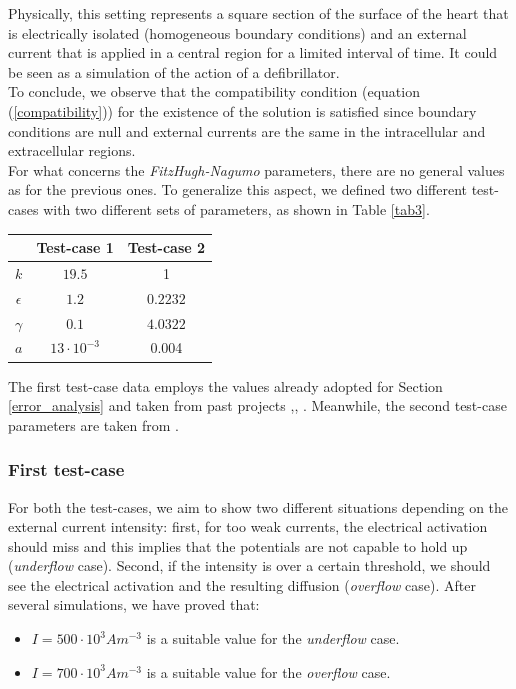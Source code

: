\documentclass[a4paper,11pt]{article}
\begin{document}
\noindent Physically, this setting represents a square section of the surface of the heart that is electrically isolated (homogeneous boundary conditions) and an external current that is applied in a central region for a limited interval of time. It could be seen as a simulation of the action of a defibrillator. \\
To conclude, we observe that the compatibility condition (equation (\ref{compatibility})) for the existence of the solution is satisfied since boundary conditions are null and external currents are the same in the intracellular and extracellular regions. \\

\noindent For what concerns the \emph{FitzHugh-Nagumo} parameters, there are no general values as for the previous ones. To generalize this aspect, we defined two different test-cases with two different sets of parameters, as shown in Table \ref{tab3}.

\begin{center}
	\label{tab3}
	\begin{tabular}{|c|c|c|} 
		\hline 
		 & Test-case 1 & Test-case 2 \\
		\hline \hline
		$k$ & $19.5 $ & 1 \\
		\hline
		$\epsilon$ & $1.2$ & $0.2232$ \\ 
		\hline
		$\gamma$ & $0.1$ & $4.0322$ \\
		\hline
		$a$ & $13\cdot 10^{-3}$ & 0.004 \\
		\hline
	\end{tabular}
\end{center}

\vspace{4mm}
\noindent The first test-case data employs the values already adopted for Section \ref{error_analysis} and taken from past projects \cite{bagnara},\cite{andreotti}, \cite{marta}. Meanwhile, the second test-case parameters are taken from \cite{mauricio}.

\subsubsection{First test-case}
For both the test-cases, we aim to show two different situations depending on the external current intensity: first, for too weak currents, the electrical activation should miss and this implies that the potentials are not capable to hold up (\emph{underflow} case). Second, if the intensity is over a certain threshold, we should see the electrical activation and the resulting diffusion (\emph{overflow} case). After several simulations, we have proved that:
\begin{itemize}
	\item $I = 500 \cdot 10^3 Am^{-3}$  is a suitable value for the \emph{underflow} case.
	\item $I = 700 \cdot 10^3 Am^{-3}$ is a suitable value for the \emph{overflow} case.
\end{itemize}
\end{document}
